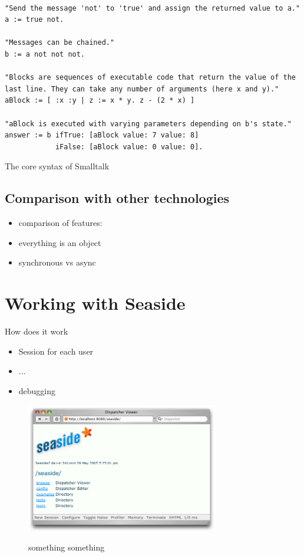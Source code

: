 \documentclass[a4paper,12pt,pagesize,headsepline,oribibl,titlepage]{scrartcl}
\begin{document}
\begin{listing}[]%
\begin{verbatim}

"Send the message 'not' to 'true' and assign the returned value to a."
a := true not.

"Messages can be chained."
b := a not not not.

"Blocks are sequences of executable code that return the value of the 
last line. They can take any number of arguments (here x and y)."
aBlock := [ :x :y | z := x * y. z - (2 * x) ]

"aBlock is executed with varying parameters depending on b's state."
answer := b ifTrue: [aBlock value: 7 value: 8] 
            iFalse: [aBlock value: 0 value: 0].

\end{verbatim}
\caption{The core syntax of Smalltalk}
\label{lst:smalltalksyntax}
\end{listing}

\subsection{Comparison with other technologies}

\begin{itemize}
\item comparison of features:
\item everything is an object
\item synchronous vs async
\end{itemize}


\section{Working with Seaside}
\label{sec:workflow}

How does it work\cite{perscheid2008introduction}

\begin{itemize}
\item Session for each user
\item ...
\item debugging
\end{itemize}

\begin{figure}[hbp]
\begin{center}
\includegraphics*[width=0.75\textwidth]{images/toolbar.png}\\
\caption{something something}
\label{abb:test}
\end{center}
\end{figure}
\end{document}
